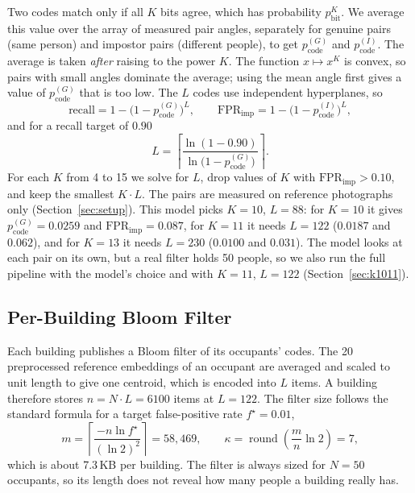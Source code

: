 \documentclass[runningheads]{llncs}
\begin{document}
Two codes match only if all $K$ bits agree, which has probability $p_{\text{bit}}^{K}$. We average this value over
the array of measured pair angles, separately for genuine pairs (same person) and impostor pairs (different people),
to get $p_{\text{code}}^{(G)}$ and $p_{\text{code}}^{(I)}$. The average is taken \emph{after} raising to the power
$K$. The function $x\mapsto x^{K}$ is convex, so pairs with small angles dominate the average; using the mean angle
first gives a value of $p_{\text{code}}^{(G)}$ that is too low. The $L$ codes use independent hyperplanes, so
\begin{equation}
  \text{recall}=1-\bigl(1-p_{\text{code}}^{(G)}\bigr)^{L},\qquad
  \text{FPR}_{\text{imp}}=1-\bigl(1-p_{\text{code}}^{(I)}\bigr)^{L},
\end{equation}
and for a recall target of $0.90$
\begin{equation}
  L=\left\lceil\frac{\ln(1-0.90)}{\ln\bigl(1-p_{\text{code}}^{(G)}\bigr)}\right\rceil.
\end{equation}
For each $K$ from 4 to 15 we solve for $L$, drop values of $K$ with $\text{FPR}_{\text{imp}}>0.10$, and keep the
smallest $K\!\cdot\!L$. The pairs are measured on reference photographs only (Section~\ref{sec:setup}). This model
picks $K=10$, $L=88$: for $K=10$ it gives $p_{\text{code}}^{(G)}=0.0259$ and $\text{FPR}_{\text{imp}}=0.087$, for
$K=11$ it needs $L=122$ ($0.0187$ and $0.062$), and for $K=13$ it needs $L=230$ ($0.0100$ and $0.031$).
The model looks at each pair on its own, but a real filter holds 50 people, so we also run the full pipeline with the
model's choice and with $K=11$, $L=122$ (Section~\ref{sec:k1011}).

\subsection{Per-Building Bloom Filter}
\label{sec:bloom}

Each building publishes a Bloom filter of its occupants' codes. The 20 preprocessed reference embeddings of an
occupant are averaged and scaled to unit length to give one centroid, which is encoded into $L$ items. A building
therefore stores $n=N\cdot L=6100$ items at $L=122$. The filter size follows the standard formula for a target
false-positive rate $f^{\star}=0.01$,
\begin{equation}
  m=\left\lceil\frac{-n\ln f^{\star}}{(\ln 2)^{2}}\right\rceil=58{,}469,\qquad
  \kappa=\operatorname{round}\!\left(\frac{m}{n}\ln 2\right)=7,
\end{equation}
which is about 7.3\,KB per building. The filter is always sized for $N=50$ occupants, so its length does not reveal
how many people a building really has.
\end{document}
